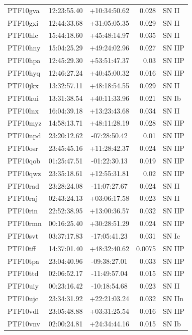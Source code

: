 \documentclass[a4paper,fleqn,usenatbib]{mnras}
\begin{document}
\begin{table}
\begin{center}
\begin{tabular}{lccrl}
    PTF10gva & 12:23:55.40 & +10:34:50.62 & 0.028 & SN II \\
    PTF10gxi & 12:44:33.68 & +31:05:05.35 & 0.029 & SN II \\
    PTF10hlc & 15:44:18.60 & +45:48:14.97 & 0.035 & SN II \\
    PTF10hny & 15:04:25.29 & +49:24:02.96 & 0.027 & SN IIP \\
    PTF10hpa & 12:45:29.30 & +53:51:47.37 & 0.03 & SN IIP \\
    PTF10hyq & 12:46:27.24 & +40:45:00.32 & 0.016 & SN IIP \\
    PTF10jkx & 13:32:57.11 & +48:18:54.55 & 0.029 & SN II \\
    PTF10kui & 13:31:38.54 & +40:11:33.96 & 0.021 & SN Ib \\
    PTF10lnx & 16:04:39.18 & +13:23:43.68 & 0.034 & SN II \\
    PTF10myz & 14:58:13.71 & +48:11:28.19 & 0.028 & SN IIP \\
    PTF10npd & 23:20:12.62 & -07:28:50.42 & 0.01 & SN IIP \\
    PTF10osr & 23:45:45.16 & +11:28:42.37 & 0.024 & SN IIP \\
    PTF10qob & 01:25:47.51 & -01:22:30.13 & 0.019 & SN IIP \\
    PTF10qwz & 23:35:18.61 & +12:55:31.81 & 0.02 & SN IIP \\
    PTF10rad & 23:28:24.08 & -11:07:27.67 & 0.024 & SN II \\
    PTF10raj & 02:43:24.13 & +03:06:17.58 & 0.023 & SN II \\
    PTF10rin & 22:52:38.95 & +13:00:36.57 & 0.032 & SN IIP \\
    PTF10rmn & 00:16:25.40 & +30:28:51.29 & 0.024 & SN IIP \\
    PTF10svt & 03:37:17.83 & -17:05:41.23 & 0.031 & SN Ic \\
    PTF10tff & 14:37:01.40 & +48:32:40.62 & 0.0075 & SN IIP \\
    PTF10tpa & 23:04:40.96 & -09:38:27.01 & 0.033 & SN IIP \\
    PTF10ttd & 02:06:52.17 & -11:49:57.04 & 0.015 & SN IIP \\
    PTF10uiy & 00:23:16.42 & -10:18:54.68 & 0.023 & SN II \\
    PTF10ujc & 23:34:31.92 & +22:21:03.24 & 0.032 & SN IIn \\
    PTF10vdl & 23:05:48.88 & +03:31:25.54 & 0.016 & SN IIP \\
    PTF10vnv & 02:00:24.81 & +24:34:44.16 & 0.015 & SN Ib \\

\end{tabular}
\end{center}
\end{table}
\end{document}

